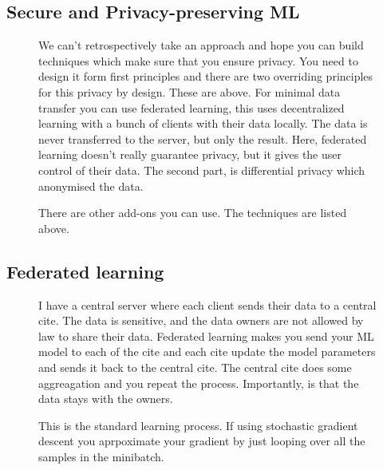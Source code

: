 \documentclass[11pt]{article}
\begin{document}
\subsection{Secure and Privacy-preserving ML}

\begin{figure}[H]
    \centering
    \caption{We can't retrospectively take an approach and hope you can build techniques which make sure that you ensure privacy. You need to design it form first principles and there are two overriding principles for this privacy by design. These are above. For minimal data transfer you can use federated learning, this uses decentralized learning with a bunch of clients with their data locally. The data is never transferred to the server, but only the result. Here, federated learning doesn't really guarantee privacy, but it gives the user control of their data. The second part, is differential privacy which anonymised the data.}
\end{figure}

\begin{figure}[H]
    \centering
    \caption{There are other add-ons you can use. The techniques are listed above.}
\end{figure}

\subsection{Federated learning}

\begin{figure}[H]
    \centering
    \caption{I have a central server where each client sends their data to a central cite. The data is sensitive, and the data owners are not allowed by law to share their data. Federated learning makes you send your ML model to each of the cite and each cite update the model parameters and sends it back to the central cite. The central cite does some aggreagation and you repeat the process. Importantly, is that the data stays with the owners.}
\end{figure}

\begin{figure}[H]
    \centering
    \caption{This is the standard learning process. If using stochastic gradient descent you aprpoximate your gradient by just looping over all the samples in the minibatch.}
\end{figure}
\end{document}
